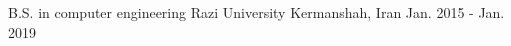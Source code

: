 

\begin{cventries}

  \cventry
  {B.S. in computer engineering} %
  {Razi University} %
  {Kermanshah, Iran} %
  {Jan. 2015 - Jan. 2019} %
  {
  }

\end{cventries}
